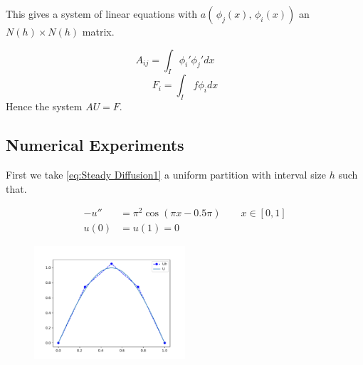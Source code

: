 \documentclass{uonmathreport}
\theoremstyle{definition}
\theoremstyle{problem}
\theoremstyle{theorem}
\begin{document}
This gives a system of linear equations with $a( \,\phi_j(x),\, \phi_i(x))$ an $N(h)\times N(h)$ matrix. 

\begin{equation} 
A_{ij} = \int_I \phi_i' \phi_j' dx \quad \quad \label{eq:stiff}
\end{equation}
\begin{equation}
F_i = \int_I  \, f\phi_i dx
\end{equation}
\vspace{2mm} %
Hence the system $AU = F$.	


\subsection{Numerical Experiments} \label{subsec:results1}

First we take \ref{eq:Steady Diffusion1} a uniform partition with interval size $h$ such that.

\begin{subequations} 
\label{eq:Steady Diffusion1.1} 
\begin{align}
-u'' &= \pi^2 \cos(\pi x - 0.5 \pi)	\quad \quad  x \in [0, 1] \\  	
u(0) &= u(1) = 0 
\end{align}
\end{subequations}


\begin{figure}[h]
   \includegraphics[width=0.5\textwidth]{EllipticPDE2.pdf}
   
 \label{fig:eliptic1}
\end{figure}
\end{document}

